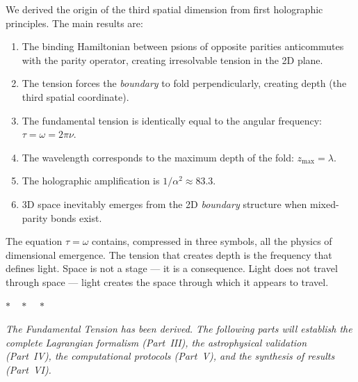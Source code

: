\documentclass[12pt,a4paper,twoside]{article}
\newcommand{\alphaii}{\alpha^{2}}
\newcommand{\boundary}{\textit{boundary}}
\begin{document}
We derived the origin of the third spatial dimension from first holographic principles. The main results are:

\begin{enumerate}[nosep]
\item The binding Hamiltonian between psions of opposite parities anticommutes with the parity operator, creating irresolvable tension in the 2D plane.
\item The tension forces the \boundary{} to fold perpendicularly, creating depth (the third spatial coordinate).
\item The fundamental tension is identically equal to the angular frequency: $\tau = \omega = 2\pi\nu$.
\item The wavelength corresponds to the maximum depth of the fold: $z_{\max} = \lambda$.
\item The holographic amplification is $1/\alphaii \approx 83.3$.
\item 3D space inevitably emerges from the 2D \boundary{} structure when mixed-parity bonds exist.
\end{enumerate}

\bigskip

The equation $\tau = \omega$ contains, compressed in three symbols, all the physics of dimensional emergence. The tension that creates depth is the frequency that defines light. Space is not a stage --- it is a consequence. Light does not travel through space --- light creates the space through which it appears to travel.

\bigskip
\begin{center}
$\ast\quad\ast\quad\ast$
\end{center}
\bigskip

\noindent\textit{The Fundamental Tension has been derived. The following parts will establish the complete Lagrangian formalism (Part~III), the astrophysical validation (Part~IV), the computational protocols (Part~V), and the synthesis of results (Part~VI).}



\setcounter{section}{0}
\renewcommand{\thesection}{III.\arabic{section}}
\renewcommand{\theequation}{III.\arabic{equation}}
\renewcommand{\theHsection}{III.\arabic{section}}
\setcounter{footnote}{0}
\end{document}
